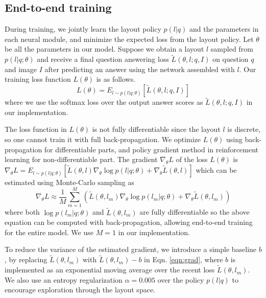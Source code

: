 \documentclass[10pt,twocolumn,letterpaper]{article}
\begin{document}
\subsection{End-to-end training}\label{sec:training}

During training, we jointly learn the layout policy $p(l | q)$ and the parameters in each neural module, and minimize the expected loss from the layout policy. Let $\theta$ be all the parameters in our model. Suppose we obtain a layout $l$ sampled from $p(l | q; \theta)$ and receive a final question answering loss $\tilde{L}(\theta, l; q, I)$ on question $q$ and image $I$ after predicting an answer using the network assembled with $l$. Our training loss function $L(\theta)$ is as follows.
\begin{equation}\label{eqn:loss}
L(\theta) = E_{l\sim p(l | q; \theta)}[\tilde{L}(\theta, l; q, I)]
\end{equation}
where we use the softmax loss over the output answer scores as $\tilde{L}(\theta, l; q, I)$ in our implementation.

The loss function in $L(\theta)$ is not fully differentiable since the layout $l$ is discrete, so one cannot train it with full back-propagation. We optimize $L(\theta)$ using back-propagation for differentiable parts, and policy gradient method in reinforcement learning for non-differentiable part. The gradient $\nabla_\theta L$ of the loss $L(\theta)$ is
$
\nabla_\theta L = E_{l\sim p(l | q; \theta)}\left[\tilde{L}(\theta, l) \nabla_\theta \log p(l | q; \theta) + \nabla_\theta \tilde{L}(\theta, l) \right]
$
which can be estimated using Monte-Carlo sampling as
\begin{equation}\label{eqn:grad}
\nabla_\theta L \approx \frac{1}{M}\sum_{m=1}^M \left( \tilde{L}(\theta, l_m) \nabla_\theta \log p(l_m | q; \theta) + \nabla_\theta \tilde{L}(\theta, l_m) \right)
\end{equation}
where both $\log p(l_m | q; \theta)$ and $\tilde{L}(\theta, l_m)$ are fully differentiable so the above equation can be computed with back-propagation, allowing end-to-end training for the entire model. We use $M=1$ in our implementation.

To reduce the variance of the estimated gradient, we introduce a simple baseline $b$, by replacing $\tilde{L}(\theta, l_m)$ with $\tilde{L}(\theta, l_m)-b$ in Eqn. \ref{eqn:grad}, where $b$ is implemented as an exponential moving average over the recent loss $\tilde{L}(\theta, l_m)$. We also use an entropy regularization $\alpha = 0.005$ over the policy $p(l | q)$ to encourage exploration through the layout space.
\end{document}
